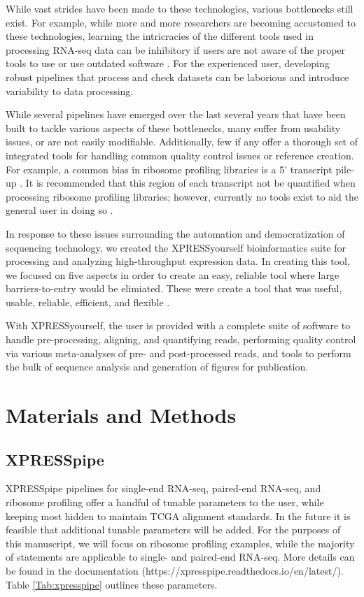\documentclass[11pt, a4paper, oneside]{article}
\begin{document}
While vast strides have been made to these technologies, various bottlenecks still exist. For example, while more and more researchers are becoming accustomed to these technologies, learning the intricracies of the different tools used in processing RNA-seq data can be inhibitory if users are not aware of the proper tools to use or use outdated software \cite{costello_npjsba, funari_science}. For the experienced user, developing robust pipelines that process and check datasets can be laborious and introduce variability to data processing.

While several pipelines have emerged over the last several years that have been built to tackle various aspects of these bottlenecks, many suffer from usability issues, or are not easily modifiable. Additionally, few if any offer a thorough set of integrated tools for handling common quality control issues or reference creation. For example, a common bias in ribosome profiling libraries is a 5' transcript pile-up \cite{gerashchenko_nar, artieri_gr, hussman_plosg}. It is recommended that this region of each transcript not be quantified when processing ribosome profiling libraries; however, currently no tools exist to aid the general user in doing so \cite{ingolia_meth, weinberg_reports}.

In response to these issues surrounding the automation and democratization of sequencing technology, we created the XPRESSyourself bioinformatics suite for processing and analyzing high-throughput expression data. In creating this tool, we focused on five aspects in order to create an easy, reliable tool where large barriers-to-entry would be elimiated. These were create a tool that was useful, usable, reliable, efficient, and flexible \cite{taschuk_ploscb}.

With XPRESSyourself, the user is provided with a complete suite of software to handle pre-processing, aligning, and quantifying reads, performing quality control via various meta-analyses of pre- and post-processed reads, and tools to perform the bulk of sequence analysis and generation of figures for publication.

\section{Materials and Methods}

\subsection{XPRESSpipe}
XPRESSpipe pipelines for single-end RNA-seq, paired-end RNA-seq, and ribosome profiling offer a handful of tunable parameters to the user, while keeping most hidden to maintain TCGA alignment standards. In the future it is feasible that additional tunable parameters will be added. For the purposes of this manuscript, we will focus on ribosome profiling examples, while the majority of statements are applicable to single- and paired-end RNA-seq. More details can be found in the documentation (https://xpresspipe.readthedocs.io/en/latest/). Table \ref{Tab:xpresspipe} outlines these parameters.
\end{document}
